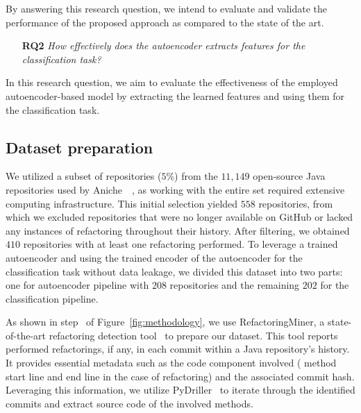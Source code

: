     By answering this research question, we intend to evaluate and validate the performance of the proposed approach as compared to the
    state of the art. 


    \begin{itemize}
    \item 
    [\textbf{RQ2}] \textit{How effectively does the autoencoder extracts features for the classification task?}
\end{itemize}    
    In this research question,
    we aim to evaluate the effectiveness of the employed autoencoder-based model by extracting the learned features and using them for the classification task.


\subsection{Dataset preparation}
\label{dataset_prep}

We utilized a subset of repositories ($5$\%) from the $11,149$ open-source Java repositories used by Aniche~\etal{}~\cite{Aniche2020Effectiveness}, as working with the entire set required extensive computing infrastructure. This initial selection yielded $558$ repositories, from which we excluded repositories that were no longer available on GitHub or lacked any instances of \exm{} refactoring throughout their history. After filtering, we obtained $410$ repositories with at least one \exm{} refactoring performed. 
To leverage a trained autoencoder and using the trained encoder of the autoencoder for the classification task without data leakage, we divided this dataset into two parts: one for autoencoder pipeline with $208$ repositories and the remaining $202$ for the classification pipeline.



As shown in step~ of Figure~\ref{fig:methodology},
we use RefactoringMiner, a state-of-the-art refactoring detection tool~\cite{Tsantalis:ICSE:2018:RefactoringMiner, Tsantalis:TSE:2020:RefactoringMiner2.0} to prepare our dataset.
This tool reports performed refactorings, if any, 
in each commit within a Java repository's history. 
It provides essential metadata such as the code component involved (\eg{} method start line and end line in the case of \exm{} refactoring) and the associated commit hash. Leveraging this information, we utilize PyDriller~\cite{Spadini2018} to iterate through the identified commits and extract source code of the involved methods.


